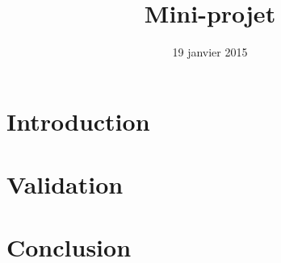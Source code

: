 \documentclass[twoside]{eiaArticle}
\title{Mini-projet }
\date{19 janvier 2015}
\author{ \eiaauthors }
\begin{document}
\eiafullpagetitlewithtocandribbon{} %

\cleardoublepage %

\section*{Introduction}
\setcounter{page}{1}







\section{Validation}






\section*{Conclusion}
\end{document}
